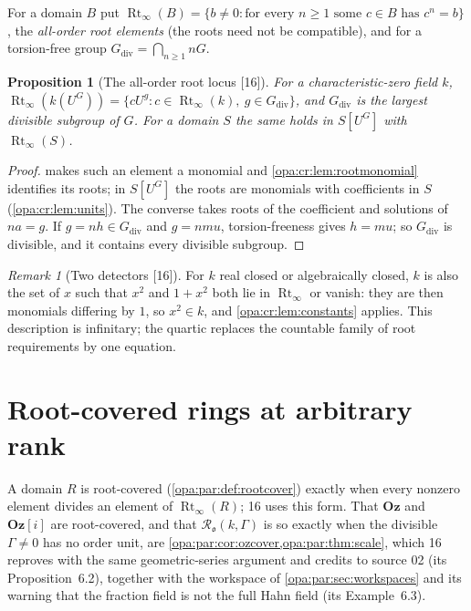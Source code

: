 \documentclass[11pt,oneside]{article}
\numberwithin{equation}{section}
\newtheorem{proposition}[proposition]{Proposition}
\theoremstyle{definition}
\theoremstyle{remark}
\newtheorem{remark}[remark]{Remark}
\newcommand{\Oz}{\mathbf{Oz}}
\newcommand{\Og}{\mathbf{Oz}[i]}
\newcommand{\oo}{\mathfrak o}
\newcommand{\src}[1]{\textup{\textsf{\small[#1]}}}
\begin{document}
For a domain $B$ put $\operatorname{Rt}_\infty(B)=\{b\ne0:\text{for every }n\ge1\text{ some }c\in B\text{ has }c^n=b\}$,
the \emph{all-order root elements} (the roots need not be compatible), and for a torsion-free group
$G_{\mathrm{div}}=\bigcap_{n\ge1}nG$.

\begin{proposition}[The all-order root locus \src{16}]\label{opa:cr:prop:rootlocus}
For a characteristic-zero field $k$, $\operatorname{Rt}_\infty(k(U^G))=\{cU^g:c\in\operatorname{Rt}_\infty(k),\ g\in G_{\mathrm{div}}\}$,
and $G_{\mathrm{div}}$ is the largest divisible subgroup of $G$. For a domain $S$ the same holds in $S[U^G]$ with
$\operatorname{Rt}_\infty(S)$.
\end{proposition}
\begin{proof}
 makes such an element a monomial and \cref{opa:cr:lem:rootmonomial} identifies its roots;
in $S[U^G]$ the roots are monomials with coefficients in $S$ (\cref{opa:cr:lem:units}). The converse takes roots of
the coefficient and solutions of $na=g$. If $g=nh\in G_{\mathrm{div}}$ and $g=nmu$, torsion-freeness gives $h=mu$; so
$G_{\mathrm{div}}$ is divisible, and it contains every divisible subgroup.
\end{proof}

\begin{remark}[Two detectors \src{16}]\label{opa:cr:rem:detectors}
For $k$ real closed or algebraically closed, $k$ is also the set of $x$ such that $x^2$ and $1+x^2$ both lie in
$\operatorname{Rt}_\infty$ or vanish: they are then monomials differing by $1$, so $x^2\in k$, and
\cref{opa:cr:lem:constants} applies. This description is infinitary; the quartic replaces the countable family of
root requirements by one equation.
\end{remark}

\section{Root-covered rings at arbitrary rank}\label{opa:cr:sec:rootcovered}

A domain $R$ is root-covered (\cref{opa:par:def:rootcover}) exactly when every nonzero element divides an element
of $\operatorname{Rt}_\infty(R)$; 16 uses this form. That $\Oz$ and $\Og$ are root-covered, and that
$\mathcal R_\oo(k,\Gamma)$ is so exactly when the divisible $\Gamma\ne0$ has no order unit, are
\cref{opa:par:cor:ozcover,opa:par:thm:scale}, which 16 reproves with the same geometric-series argument and credits
to source 02 (its Proposition~6.2), together with the workspace of \cref{opa:par:sec:workspaces} and its warning that
the fraction field is not the full Hahn field (its Example~6.3).
\end{document}
